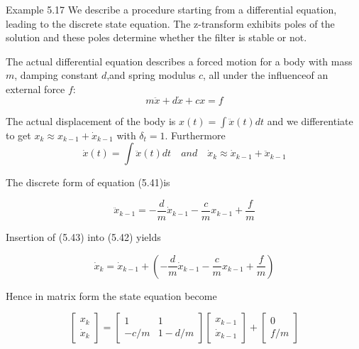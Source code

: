    Example 5.17 We describe a procedure starting from a differential equation, leading to the discrete state equation. The z-transform exhibits poles of the solution and these poles determine whether the filter is stable or not.
   
   The actual differential equation describes a forced motion for a body with mass $ m $, damping constant $ d $,and spring modulus $ c $, all under the influenceof an external force $ f $: 
   \begin{equation}\label{5.41}
    m \ddot x + d \dot{x} +cx = f
   \end{equation}
   
   
   The actual displacement of the body is $ x(t)=\int \ddot{x}(t)dt  $ and we differentiate to get $ x_{k}\approx x_{k-1}+\dot{x}_{k-1} $ with $ \delta_{t}=1 $. Furthermore
   \begin{equation}\label{5.42}
   \dot{x}(t)=\int \ddot{x} (t)dt \quad and \quad \dot{x}_{k}\approx\dot{x}_{k-1}+\ddot{x}_{k-1}
   \end{equation}
   
   
   The discrete form of equation (5.41)is
   
   \begin{equation}\label{5.43}
   \ddot{x}_{k-1}=- \frac{d}{m}\dot{x}_{k-1}-\frac{c}{m}x_{k-1}+\frac{f}{m}
   \end{equation}
   
   
   Insertion of (5.43) into (5.42) yields
   
   \[ \dot{x}_{k}=\dot{x}_{k-1}+(- \frac{d}{m}\dot{x}_{k-1}-\frac{c}{m}x_{k-1}+\frac{f}{m}) \]
   
   Hence in matrix form the state equation become
   
   \[ \begin{bmatrix}
   x_{k}\\\dot{x}_{k}
   \end{bmatrix} = \begin{bmatrix}
   1&1\\-c/m&1-d/m
   \end{bmatrix} \begin{bmatrix}
   x_{k-1}\\\dot{x}_{k-1}
   \end{bmatrix}+\begin{bmatrix}
   0\\f/m
   \end{bmatrix}\]
   
